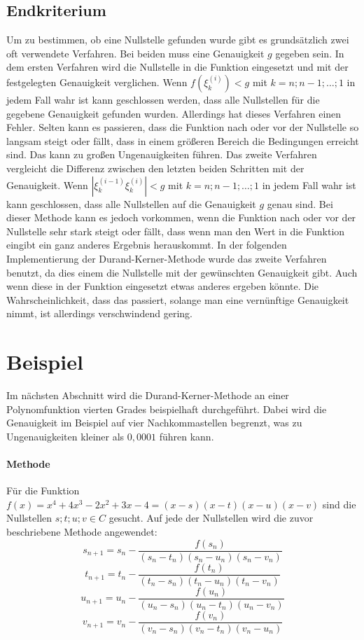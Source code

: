 \documentclass[12pt]{article}
\begin{document}
\subsection{Endkriterium}
Um zu bestimmen, ob eine Nullstelle gefunden wurde gibt es grundsätzlich zwei oft verwendete Verfahren. Bei beiden muss eine Genauigkeit $g$ gegeben sein. 
In dem ersten Verfahren wird die Nullstelle in die Funktion eingesetzt und mit der festgelegten Genauigkeit verglichen. Wenn $f(\xi_k^{(i)}) < g$ mit $k=n;n-1;\dots ;1$ in jedem Fall wahr ist kann geschlossen werden, dass alle Nullstellen für die gegebene Genauigkeit gefunden wurden. Allerdings hat dieses Verfahren einen Fehler. Selten kann es passieren, dass die Funktion nach oder vor der Nullstelle so langsam steigt oder fällt, dass in einem größeren Bereich die Bedingungen erreicht sind. Das kann zu großen Ungenauigkeiten führen. Das zweite Verfahren vergleicht die Differenz zwischen den letzten beiden Schritten mit der Genauigkeit. Wenn $|\xi_k^{(i-1)}\xi_k^{(i)}| < g$ mit $k=n;n-1;\dots ;1$ in jedem Fall wahr ist kann geschlossen, dass alle Nullstellen auf die Genauigkeit $g$ genau sind. Bei dieser Methode kann es jedoch vorkommen, wenn die Funktion nach oder vor der Nullstelle sehr stark steigt oder fällt, dass wenn man den Wert in die Funktion eingibt ein ganz anderes Ergebnis herauskommt. In der folgenden Implementierung der Durand-Kerner-Methode wurde das zweite Verfahren benutzt, da dies einem die Nullstelle mit der gewünschten Genauigkeit gibt. Auch wenn diese in der Funktion eingesetzt etwas anderes ergeben könnte. Die Wahrscheinlichkeit, dass das passiert, solange man eine vernünftige Genauigkeit nimmt, ist allerdings verschwindend gering. 

\section{Beispiel}
Im nächsten Abschnitt wird die Durand-Kerner-Methode an einer Polynomfunktion vierten Grades beispielhaft durchgeführt. Dabei wird die Genauigkeit im Beispiel auf vier Nachkommastellen begrenzt, was zu Ungenauigkeiten kleiner als $0,0001$ führen kann.
\paragraph{Methode}
Für die Funktion $f(x) = x^4 + 4x^3 - 2x^2 + 3x - 4 = (x-s)(x-t)(x-u)(x-v)$ sind die Nullstellen $s;t;u;v \in C$ gesucht. Auf jede der Nullstellen wird die zuvor beschriebene Methode angewendet:
\begin{displaymath}
    s_{n+1} = s_n-\frac{f(s_n)}{(s_n-t_n)(s_n-u_n)(s_n-v_n)}
\end{displaymath}
\begin{displaymath}
    t_{n+1} = t_n-\frac{f(t_n)}{(t_n-s_n)(t_n-u_n)(t_n-v_n)}
\end{displaymath}
\begin{displaymath}
    u_{n+1} = u_n-\frac{f(u_n)}{(u_n-s_n)(u_n-t_n)(u_n-v_n)}
\end{displaymath}
\begin{displaymath}
    v_{n+1} = v_n-\frac{f(v_n)}{(v_n-s_n)(v_n-t_n)(v_n-u_n)}
\end{displaymath}
\end{document}
